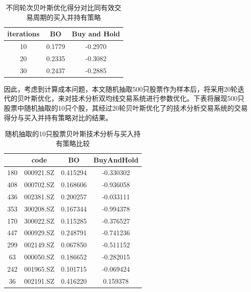 \documentclass[twoside,longtitle]{LZUthesis}
\begin{document}
\begin{table}[h]
\centering
\begin{tabular}{ccc}
\hline
iterations & BO    & Buy and Hold \\\hline
10 & 0.1779& -0.2970\\
20 & 0.2335& -0.3082\\
30         & 0.2437 & -0.2885        \\\hline
\end{tabular}
\caption{不同轮次贝叶斯优化得分对比同有效交易周期的买入并持有策略}
\label{tab:my-table}
\end{table}

因此，考虑到计算成本问题，本文随机抽取500只股票作为样本后，将采用20轮迭代的贝叶斯优化，来对技术分析双均线交易系统进行参数优化。下表将展现500只股票中随机抽取的10只个股，其经过20轮贝叶斯优化了的技术分析交易系统的交易得分与买入并持有策略对比的结果。

\begin{table}[h]
\centering
\begin{tabular}{cccc}
\hline
    & \textbf{code} & \textbf{BO} & \textbf{BuyAndHold} \\ \hline
180 & 000921.SZ     & 0.415294    & -0.330302           \\
408 & 000702.SZ     & 0.168606    & -0.936058           \\
436 & 002381.SZ     & 0.200257    & -0.033111           \\
353 & 300208.SZ     & 0.167344    & -0.994378           \\
170 & 300022.SZ     & 0.115285    & -0.376527           \\
447 & 000929.SZ     & 0.248791    & -0.741236           \\
299 & 002149.SZ     & 0.067850    & -0.511152           \\
63  & 000050.SZ     & 0.186652    & -0.282015           \\
242 & 001965.SZ     & 0.101715    & -0.069424           \\
36  & 002191.SZ     & 0.416220    & 0.159378            \\ \hline
\end{tabular}
\caption{随机抽取的10只股票贝叶斯技术分析与买入持有策略比较}
\label{tab:my-table}
\end{table}
\end{document}

